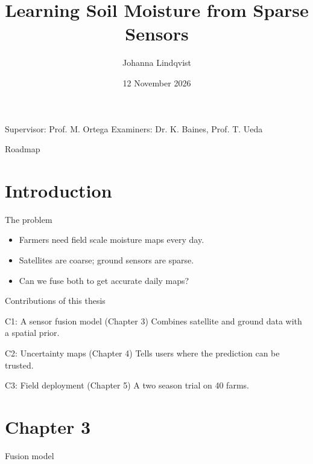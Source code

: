 \documentclass{beamer}
\title[PhD Defence]{Learning Soil Moisture from Sparse Sensors}
\author[J. Lindqvist]{Johanna Lindqvist}
\institute[Dept. of Earth Sciences]{Doctoral Thesis Defence\\Department of Earth Sciences, Halden University}
\date{12 November 2026}
\begin{document}
\begin{frame}
  \titlepage
  \centering\footnotesize
  Supervisor: Prof. M. Ortega \quad Examiners: Dr. K. Baines, Prof. T. Ueda
\end{frame}

\begin{frame}{Roadmap}
  \tableofcontents
\end{frame}

\section{Introduction}
\begin{frame}{The problem}
  \begin{itemize}
    \item Farmers need field scale moisture maps every day.
    \item Satellites are coarse; ground sensors are sparse.
    \item Can we fuse both to get accurate daily maps?
  \end{itemize}
\end{frame}

\begin{frame}{Contributions of this thesis}
  \begin{block}{C1: A sensor fusion model (Chapter 3)}
    Combines satellite and ground data with a spatial prior.
  \end{block}
  \begin{block}{C2: Uncertainty maps (Chapter 4)}
    Tells users where the prediction can be trusted.
  \end{block}
  \begin{block}{C3: Field deployment (Chapter 5)}
    A two season trial on 40 farms.
  \end{block}
\end{frame}

\section{Chapter 3}
\begin{frame}{Fusion model}
  \centering
\end{frame}
\end{document}

